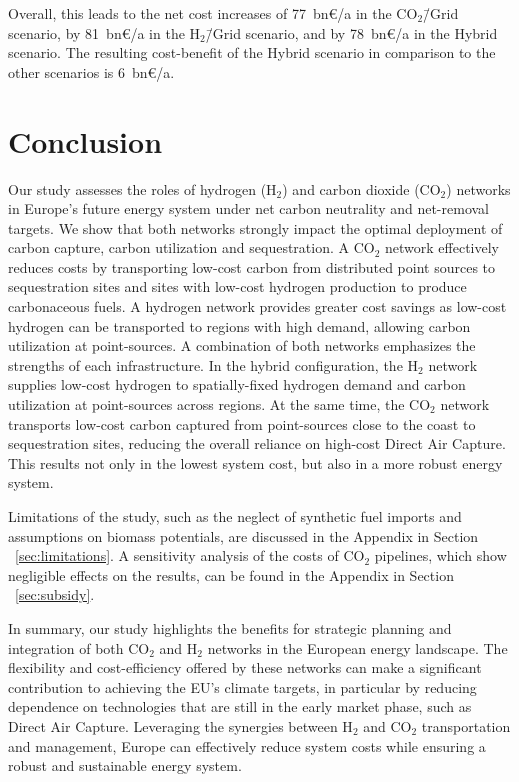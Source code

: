 \documentclass[twocolumn]{article}
\newcommand{\carbon}{CO$_2$}
\newcommand{\hydrogen}{H$_2$}
\newcommand{\carbonscenario}{CO$_2$\=/Grid scenario}
\newcommand{\hydrogenscenario}{H$_2$\=/Grid scenario}
\newcommand{\hybridscenario}{Hybrid scenario}
\begin{document}
Overall, this leads to the net cost increases of 77~bn€/a in the \carbonscenario{}, by 81~bn€/a in the \hydrogenscenario{}, and by 78~bn€/a in the \hybridscenario{}. The resulting cost-benefit of the \hybridscenario{} in comparison to the other scenarios is 6~bn€/a.


\section{Conclusion}
\label{sec:conclusion}


Our study assesses the roles of hydrogen (\hydrogen{}) and carbon dioxide (\carbon{}) networks in Europe's future energy system under net carbon neutrality and net-removal targets. We show that both networks strongly impact the optimal deployment of carbon capture, carbon utilization and sequestration. A \carbon{} network effectively reduces costs by transporting low-cost carbon from distributed point sources to sequestration sites and sites with low-cost hydrogen production to produce carbonaceous fuels. A hydrogen network provides greater cost savings as low-cost hydrogen can be transported to regions with high demand, allowing carbon utilization at point-sources. A combination of both networks emphasizes the strengths of each infrastructure. In the hybrid configuration, the \hydrogen{} network supplies low-cost hydrogen to spatially-fixed hydrogen demand and carbon utilization at point-sources across regions. At the same time, the \carbon{} network transports low-cost carbon captured from point-sources close to the coast to sequestration sites, reducing the overall reliance on high-cost Direct Air Capture. This results not only in the lowest system cost, but also in a more robust energy system.


Limitations of the study, such as the neglect of synthetic fuel imports and assumptions on biomass potentials, are discussed in the Appendix in Section ~\ref{sec:limitations}. A sensitivity analysis of the costs of \carbon{} pipelines, which show negligible effects on the results, can be found in the Appendix in Section ~\ref{sec:subsidy}.

In summary, our study highlights the benefits for strategic planning and integration of both \carbon{} and \hydrogen{} networks in the European energy landscape. The flexibility and cost-efficiency offered by these networks can make a significant contribution to achieving the EU's climate targets, in particular by reducing dependence on technologies that are still in the early market phase, such as Direct Air Capture. Leveraging the synergies between \hydrogen{} and \carbon{} transportation and management, Europe can effectively reduce system costs while ensuring a robust and sustainable energy system.
\end{document}
